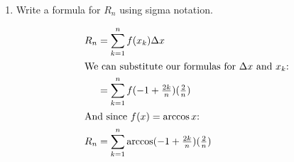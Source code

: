 \documentclass{article}
\begin{document}
\begin{enumerate}
\begin{enumerate}
\begin{enumerate}
        \item
        \begin{problem}
            Write a formula for $R_n$ using sigma notation.
        \end{problem}

        \begin{solution}
            \begin{align*}
                R_n &= \sum_{k=1}^n f(x_k)\Delta x \\
                \intertext{We can substitute our formulas for $\Delta x$ and $x_k$:}
                &= \sum_{k=1}^n f(-1+\tfrac{2k}{n})(\tfrac{2}{n})\\
                \intertext{And since $f(x)=\arccos x$:}
                R_n &= \sum_{k=1}^n \arccos(-1+\tfrac{2k}{n})(\tfrac{2}{n})
            \end{align*}
        \end{solution}
    \end{enumerate}
    
\end{enumerate}

   \end{enumerate} 
\end{document}
